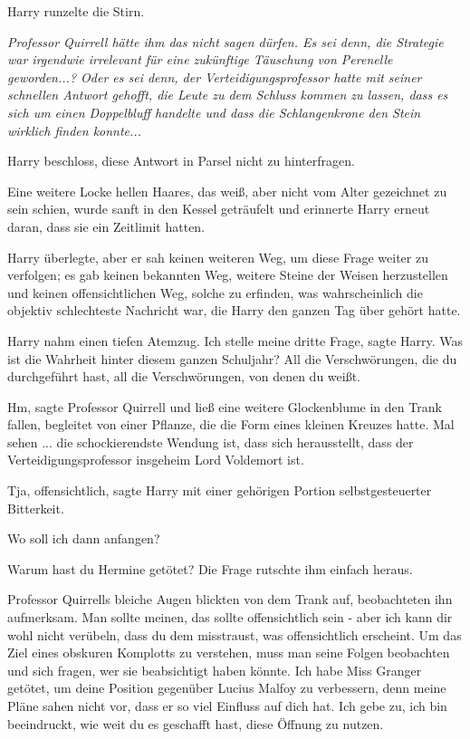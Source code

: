 Harry runzelte die Stirn.

\emph{Professor Quirrell hätte ihm das nicht sagen dürfen. Es sei denn, die
Strategie war irgendwie irrelevant für eine zukünftige Täuschung von Perenelle
geworden...? Oder es sei denn, der Verteidigungsprofessor hatte mit seiner
schnellen Antwort gehofft, die Leute zu dem Schluss kommen zu lassen, dass es
sich um einen Doppelbluff handelte und dass die Schlangenkrone den Stein
wirklich finden konnte...}

Harry beschloss, diese Antwort in Parsel nicht zu hinterfragen.

Eine weitere Locke hellen Haares, das weiß, aber nicht vom Alter gezeichnet zu
sein schien, wurde sanft in den Kessel geträufelt und erinnerte Harry erneut
daran, dass sie ein Zeitlimit hatten.

Harry überlegte, aber er sah keinen weiteren Weg, um diese Frage weiter zu
verfolgen; es gab keinen bekannten Weg, weitere Steine der Weisen herzustellen
und keinen offensichtlichen Weg, solche zu erfinden, was wahrscheinlich die
objektiv schlechteste Nachricht war, die Harry den ganzen Tag über gehört hatte.

Harry nahm einen tiefen Atemzug. \glqq{}Ich stelle meine dritte Frage\grqq{},
sagte Harry. \glqq{}Was ist die Wahrheit hinter diesem ganzen Schuljahr? All die
Verschwörungen, die du durchgeführt hast, all die Verschwörungen, von denen du
weißt.\grqq{}

\glqq{}Hm\grqq{}, sagte Professor Quirrell und ließ eine weitere Glockenblume in
den Trank fallen, begleitet von einer Pflanze, die die Form eines kleinen
Kreuzes hatte. \glqq{}Mal sehen ... die schockierendste Wendung ist, dass sich
herausstellt, dass der Verteidigungsprofessor insgeheim Lord Voldemort ist.\grqq{}

\glqq{}Tja, offensichtlich\grqq{}, sagte Harry mit einer gehörigen Portion
selbstgesteuerter Bitterkeit.

\glqq{}Wo soll ich dann anfangen?\grqq{}

\glqq{}Warum hast du Hermine getötet?\grqq{} Die Frage rutschte ihm einfach heraus.

Professor Quirrells bleiche Augen blickten von dem Trank auf, beobachteten ihn
aufmerksam. \glqq{}Man sollte meinen, das sollte offensichtlich sein - aber ich
kann dir wohl nicht verübeln, dass du dem misstraust, was offensichtlich
erscheint. Um das Ziel eines obskuren Komplotts zu verstehen, muss man seine
Folgen beobachten und sich fragen, wer sie beabsichtigt haben könnte. Ich habe
Miss Granger getötet, um deine Position gegenüber Lucius Malfoy zu verbessern,
denn meine Pläne sahen nicht vor, dass er so viel Einfluss auf dich hat. Ich
gebe zu, ich bin beeindruckt, wie weit du es geschafft hast, diese Öffnung zu
nutzen.\grqq{}

